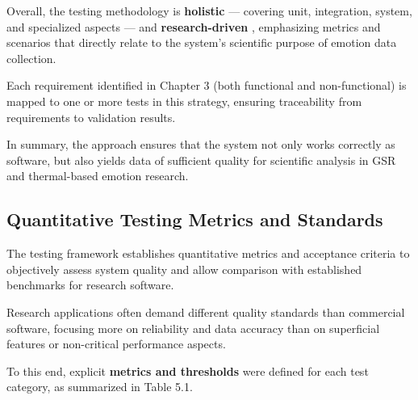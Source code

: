 Overall, the testing methodology is \textbf{holistic}
 --- covering unit, integration, system, and specialized aspects --- and
 \textbf{research-driven}
, emphasizing metrics and scenarios that directly relate to the system's scientific
purpose of emotion data collection.

Each requirement identified in Chapter 3 (both functional and non-functional) is
mapped to one or more tests in this strategy, ensuring traceability from requirements
to validation results.

In summary, the approach ensures that the system not only works correctly as
software, but also yields data of sufficient quality for scientific analysis in GSR
and thermal-based emotion research.

\subsection{Quantitative Testing Metrics and Standards}

The testing framework establishes quantitative metrics and acceptance criteria to
objectively assess system quality and allow comparison with established benchmarks
for research software.

Research applications often demand different quality standards than commercial
software, focusing more on reliability and data accuracy than on superficial features
or non-critical performance aspects.

To this end, explicit \textbf{metrics and thresholds}
 were defined for each test category, as summarized in Table 5.1.


